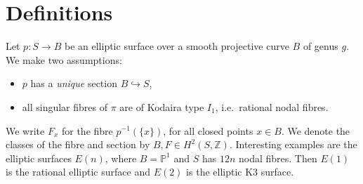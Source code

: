 \documentclass{amsart}
\theoremstyle{definition}
\newcommand{\ZZ} {\mathbb{Z}}		%
\newcommand{\PP} {\mathbb{P}}
\begin{document}
\section{Definitions}

Let $p : S \rightarrow B$ be an elliptic surface over a smooth projective curve $B$ of genus $g$. We make two assumptions:
\begin{itemize}
\item $p$ has a \emph{unique} section $B \hookrightarrow S$,
\item all singular fibres of $\pi$ are of Kodaira type $I_1$, i.e.~rational nodal fibres. 
\end{itemize}
We write $F_x$ for the fibre $p^{-1}(\{x\})$, for all closed points $x \in B$. We denote the classes of the fibre and section by $B, F \in H^2(S,\ZZ)$. Interesting examples are the elliptic surfaces $E(n)$, where $B = \PP^1$ and $S$ has $12n$ nodal fibres. Then $E(1)$ is the rational elliptic surface and $E(2)$ is the elliptic K3 surface.
\end{document}
